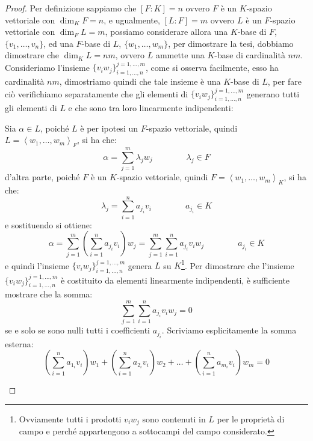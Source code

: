 \documentclass[11pt]{scrartcl}
\begin{document}
\begin{center}
\end{center}


\begin{proof}
Per definizione sappiamo che $[F:K] = n$ ovvero $F$ è un $K$-spazio vettoriale con $\dim_KF = n$, e ugualmente, $[L:F] = m$ ovvero $L$ è un $F$-spazio vettoriale con $\dim_FL = m$, possiamo considerare allora una $K$-base di $F$, $\{v_1,\ldots,v_n\}$, ed una $F$-base di $L$, $\{w_1,\ldots,w_m\}$, per dimostrare la tesi, dobbiamo dimostrare che $\dim_KL = nm$, ovvero $L$ ammette una $K$-base di cardinalità $nm$. Consideriamo l'insieme $\{v_iw_j\}_{i=1,\ldots,n}^{j=1,\ldots,m}$, come si osserva facilmente, esso ha cardinalità $nm$, dimostriamo quindi che tale insieme è una $K$-base di $L$, per fare ciò verifichiamo separatamente che gli elementi di $\{v_iw_j\}_{i=1,\ldots,n}^{j=1,\ldots,m}$ generano tutti gli elementi di $L$ e che sono tra loro linearmente indipendenti:
	\begin{itemize}
	\ii Sia $\alpha \in L$, poiché $L$ è per ipotesi un $F$-spazio vettoriale, quindi $L = \left<w_1,\ldots,w_m\right>_F$, si ha che:
		\[ \alpha = \sum_{j=1}^{m} \lambda_jw_j
		\qquad\qquad \lambda_j \in F
		\]
		d'altra parte, poiché $F$ è un $K$-spazio vettoriale, quindi $F = \left<w_1,\ldots,w_m\right>_K$, si ha che:
		\[ \lambda_j = \sum_{i=1}^{n} a_{j_i}v_i
		\qquad\qquad a_{j_i} \in K
		\]
		e sostituendo si ottiene:
		\[ \alpha = \sum_{j=1}^{m} \left( \sum_{i=1}^{n} a_{j_i}v_i\right)w_j = \sum_{j=1}^{m}\sum_{i=1}^{n} a_{j_i}v_iw_j
		\qquad\qquad a_{j_i} \in K
		\]
e quindi l'insieme $\{v_iw_j\}_{i=1,\ldots,n}^{j=1,\ldots,m}$ genera $L$ su $K$\footnote{Ovviamente tutti i prodotti $v_iw_j$ sono contenuti in $L$ per le proprietà di campo e perché appartengono a sottocampi del campo considerato.}.
	\ii Per dimostrare che l'insieme $\{v_iw_j\}_{i=1,\ldots,n}^{j=1,\ldots,m}$ è costituito da elementi linearmente indipendenti, è sufficiente mostrare che la somma:
		\[ \sum_{j=1}^{m}\sum_{i=1}^{n} a_{j_i}v_iw_j = 0
		\]
se e solo se sono nulli tutti i coefficienti $a_{j_i}$. Scriviamo esplicitamente la somma esterna:
	\[ \left(\sum_{i=1}^{n} a_{1_i}v_i\right)w_1 +  \left(\sum_{i=1}^{n} a_{2_i}v_i\right)w_2 + \ldots +  \left(\sum_{i=1}^{n} a_{m_i}v_i\right)w_m = 0
\]
\end{itemize}
\end{proof}
\end{document}
